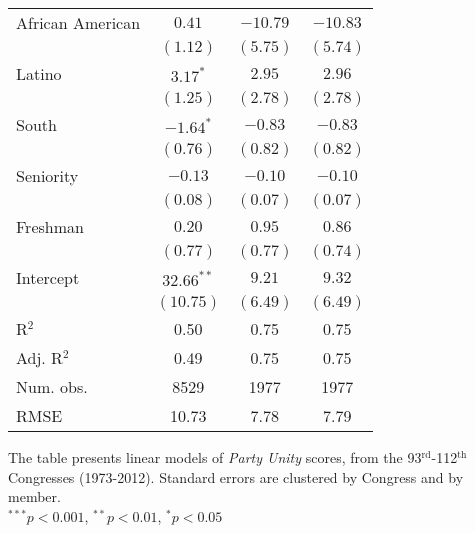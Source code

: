 \documentclass[12pt]{article}
\begin{document}
\begin{table}[!htbp]
{\begin{threeparttable}
\begin{tabular}{l c c c }
African American      & $0.41$        & $-10.79$      & $-10.83$      \\
                      & $(1.12)$      & $(5.75)$      & $(5.74)$      \\
Latino                & $3.17^{*}$    & $2.95$        & $2.96$        \\
                      & $(1.25)$      & $(2.78)$      & $(2.78)$      \\
South                 & $-1.64^{*}$   & $-0.83$       & $-0.83$       \\
                      & $(0.76)$      & $(0.82)$      & $(0.82)$      \\
Seniority             & $-0.13$       & $-0.10$       & $-0.10$       \\
                      & $(0.08)$      & $(0.07)$      & $(0.07)$      \\
Freshman              & $0.20$        & $0.95$        & $0.86$        \\
                      & $(0.77)$      & $(0.77)$      & $(0.74)$      \\
Intercept             & $32.66^{**}$  & $9.21$        & $9.32$        \\
                      & $(10.75)$     & $(6.49)$      & $(6.49)$      \\
\hline
R$^2$                 & 0.50          & 0.75          & 0.75          \\
Adj. R$^2$            & 0.49          & 0.75          & 0.75          \\
Num. obs.             & 8529          & 1977          & 1977          \\
RMSE                  & 10.73         & 7.78          & 7.79          \\
\hline

\end{tabular}
\begin{tablenotes}
   \item
   The table presents linear models of \textit{Party Unity} scores,
   from the 93$^{\text{rd}}$-112$^{\text{th}}$ Congresses (1973-2012).
  Standard errors are clustered by Congress and by member.\\
   $^{***}p<0.001$, $^{**}p<0.01$, $^*p<0.05$
 \end{tablenotes}
\end{threeparttable}
}
\end{table}
\end{document}
